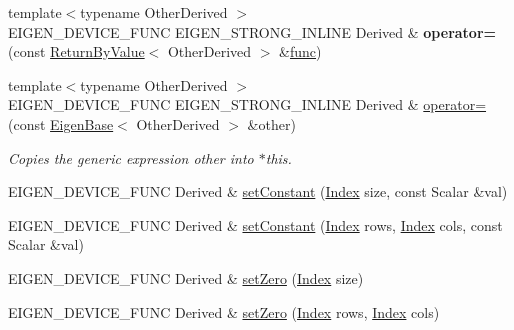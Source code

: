 \begin{DoxyCompactItemize}
\item 
\mbox{\label{class_eigen_1_1_plain_object_base_a1682d60af2dd00c27507043aade71556}} 
{\footnotesize template$<$typename Other\+Derived $>$ }\\E\+I\+G\+E\+N\+\_\+\+D\+E\+V\+I\+C\+E\+\_\+\+F\+U\+NC E\+I\+G\+E\+N\+\_\+\+S\+T\+R\+O\+N\+G\+\_\+\+I\+N\+L\+I\+NE Derived \& {\bfseries operator=} (const \hyperlink{group___core___module_class_eigen_1_1_return_by_value}{Return\+By\+Value}$<$ Other\+Derived $>$ \&\hyperlink{structfunc}{func})
\item 
{\footnotesize template$<$typename Other\+Derived $>$ }\\E\+I\+G\+E\+N\+\_\+\+D\+E\+V\+I\+C\+E\+\_\+\+F\+U\+NC E\+I\+G\+E\+N\+\_\+\+S\+T\+R\+O\+N\+G\+\_\+\+I\+N\+L\+I\+NE Derived \& \hyperlink{class_eigen_1_1_plain_object_base_a6d280056e43429f043e8b25262ee6153}{operator=} (const \hyperlink{group___core___module_struct_eigen_1_1_eigen_base}{Eigen\+Base}$<$ Other\+Derived $>$ \&other)
\begin{DoxyCompactList}\small\item\em Copies the generic expression {\itshape other} into $\ast$this. \end{DoxyCompactList}\item 
E\+I\+G\+E\+N\+\_\+\+D\+E\+V\+I\+C\+E\+\_\+\+F\+U\+NC Derived \& \hyperlink{class_eigen_1_1_plain_object_base_ac8dea1df3d92b752cc683ff42abf6f9b}{set\+Constant} (\hyperlink{namespace_eigen_a62e77e0933482dafde8fe197d9a2cfde}{Index} size, const Scalar \&val)
\item 
E\+I\+G\+E\+N\+\_\+\+D\+E\+V\+I\+C\+E\+\_\+\+F\+U\+NC Derived \& \hyperlink{class_eigen_1_1_plain_object_base_a56d1fe5d2156174f88341e563bb3c5a9}{set\+Constant} (\hyperlink{namespace_eigen_a62e77e0933482dafde8fe197d9a2cfde}{Index} rows, \hyperlink{namespace_eigen_a62e77e0933482dafde8fe197d9a2cfde}{Index} cols, const Scalar \&val)
\item 
E\+I\+G\+E\+N\+\_\+\+D\+E\+V\+I\+C\+E\+\_\+\+F\+U\+NC Derived \& \hyperlink{class_eigen_1_1_plain_object_base_ac21ad5f989f320e46958b75ac8d9a1da}{set\+Zero} (\hyperlink{namespace_eigen_a62e77e0933482dafde8fe197d9a2cfde}{Index} size)
\item 
E\+I\+G\+E\+N\+\_\+\+D\+E\+V\+I\+C\+E\+\_\+\+F\+U\+NC Derived \& \hyperlink{class_eigen_1_1_plain_object_base_a4f7022ad80446854a068d4d3bfa98446}{set\+Zero} (\hyperlink{namespace_eigen_a62e77e0933482dafde8fe197d9a2cfde}{Index} rows, \hyperlink{namespace_eigen_a62e77e0933482dafde8fe197d9a2cfde}{Index} cols)

\end{DoxyCompactItemize}
